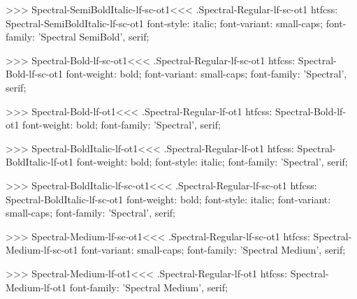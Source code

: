 >>>
\<Spectral-SemiBoldItalic-lf-sc-ot1\><<<
.Spectral-Regular-lf-sc-ot1
htfcss:  Spectral-SemiBoldItalic-lf-sc-ot1  font-style: italic; font-variant: small-caps; font-family: 'Spectral SemiBold', serif;

>>>
\<Spectral-Bold-lf-sc-ot1\><<<
.Spectral-Regular-lf-sc-ot1
htfcss:  Spectral-Bold-lf-sc-ot1  font-weight: bold; font-variant: small-caps; font-family: 'Spectral', serif;

>>>
\<Spectral-Bold-lf-ot1\><<<
.Spectral-Regular-lf-ot1
htfcss:  Spectral-Bold-lf-ot1  font-weight: bold; font-family: 'Spectral', serif;

>>>
\<Spectral-BoldItalic-lf-ot1\><<<
.Spectral-Regular-lf-ot1
htfcss:  Spectral-BoldItalic-lf-ot1  font-weight: bold; font-style: italic; font-family: 'Spectral', serif;

>>>
\<Spectral-BoldItalic-lf-sc-ot1\><<<
.Spectral-Regular-lf-sc-ot1
htfcss:  Spectral-BoldItalic-lf-sc-ot1  font-weight: bold; font-style: italic; font-variant: small-caps; font-family: 'Spectral', serif;

>>>
\<Spectral-Medium-lf-sc-ot1\><<<
.Spectral-Regular-lf-sc-ot1
htfcss:  Spectral-Medium-lf-sc-ot1  font-variant: small-caps; font-family: 'Spectral Medium', serif;

>>>
\<Spectral-Medium-lf-ot1\><<<
.Spectral-Regular-lf-ot1
htfcss:  Spectral-Medium-lf-ot1  font-family: 'Spectral Medium', serif;


